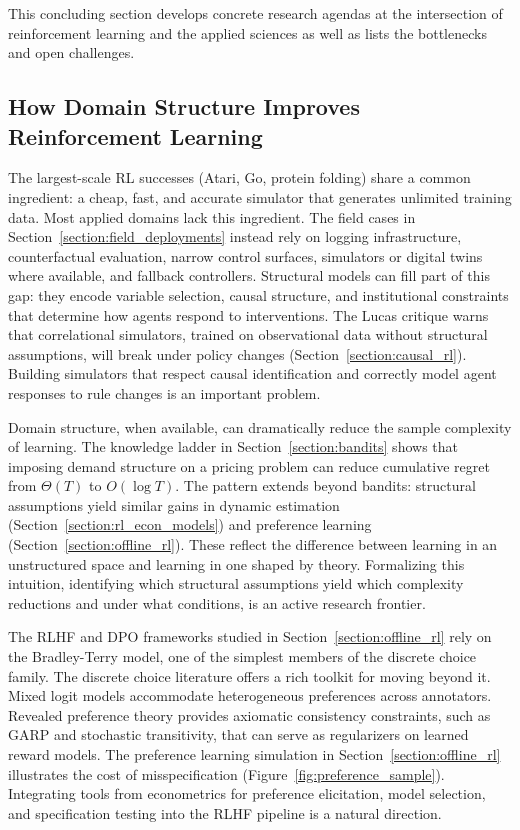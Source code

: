 This concluding section develops concrete research agendas at the intersection of reinforcement learning and the applied sciences as well as lists the bottlenecks and open challenges.

\subsection{How Domain Structure Improves Reinforcement Learning}

The largest-scale RL successes (Atari, Go, protein folding) share a common ingredient: a cheap, fast, and accurate simulator that generates unlimited training data. Most applied domains lack this ingredient. The field cases in Section~\ref{section:field_deployments} instead rely on logging infrastructure, counterfactual evaluation, narrow control surfaces, simulators or digital twins where available, and fallback controllers. Structural models can fill part of this gap: they encode variable selection, causal structure, and institutional constraints that determine how agents respond to interventions. The Lucas critique warns that correlational simulators, trained on observational data without structural assumptions, will break under policy changes (Section~\ref{section:causal_rl}). Building simulators that respect causal identification and correctly model agent responses to rule changes is an important problem.

Domain structure, when available, can dramatically reduce the sample complexity of learning. The knowledge ladder in Section~\ref{section:bandits} shows that imposing demand structure on a pricing problem can reduce cumulative regret from $\Theta(T)$ to $O(\log T)$. The pattern extends beyond bandits: structural assumptions yield similar gains in dynamic estimation (Section~\ref{section:rl_econ_models}) and preference learning (Section~\ref{section:offline_rl}). These reflect the difference between learning in an unstructured space and learning in one shaped by theory. Formalizing this intuition, identifying which structural assumptions yield which complexity reductions and under what conditions, is an active research frontier.

The RLHF and DPO frameworks studied in Section~\ref{section:offline_rl} rely on the Bradley-Terry model, one of the simplest members of the discrete choice family. The discrete choice literature offers a rich toolkit for moving beyond it. Mixed logit models accommodate heterogeneous preferences across annotators. Revealed preference theory provides axiomatic consistency constraints, such as GARP and stochastic transitivity, that can serve as regularizers on learned reward models. The preference learning simulation in Section~\ref{section:offline_rl} illustrates the cost of misspecification (Figure~\ref{fig:preference_sample}). Integrating tools from econometrics for preference elicitation, model selection, and specification testing into the RLHF pipeline is a natural direction.

